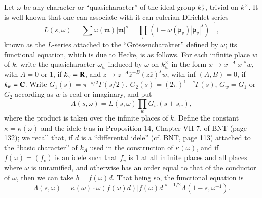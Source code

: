 Let $\omega$ be any character or ``quasicharacter'' of the ideal group $k^{\times}_{A}$, trivial on $k^{\times}$. It is well known that one can associate with it can eulerian Dirichlet series
\begin{equation*}
L(s,\omega)=\sum \omega(\mathfrak{m})|\mathfrak{m}|^{s}=\prod\limits_{v}(1-\omega(\mathfrak{p}_{v})|\mathfrak{p}_{v}|^{s})^{-1},\tag{2}\label{art21-eq2}
\end{equation*}
known as the $L$-series attached to the ``Gr\"ossencharakter'' defined by $\omega$; its functional equation, which is due to Hecke, is as follows. For each infinite place $w$ of $k$, write the quasicharacter $\omega_{w}$ induced by $\omega$ on $k^{\times}_{w}$ in the form $x\to x^{-A}|x|^{s}w$, with $A=0$ or $1$, if $k_{w}=\mathbf{R}$, and $z\to z^{-A}\overline{z}^{-B}(z\overline{z})^{s}w$, with inf $(A,B)=0$, if $k_{w}=\mathbf{C}$. Write $G_{1}(s)=\pi^{-s/2}\Gamma(s/2)$, $G_{2}(s)=(2\pi)^{1-s}\Gamma(s)$, $G_{w}=G_{1}$ or $G_{2}$ according as $w$ is real or imaginary, and put
$$
\Lambda (s,\omega)=L(s,\omega)\prod\limits_{w}G_{w}(s+s_{w}),
$$
where the product is taken over the infinite places of $k$. Define the constant $\kappa=\kappa(\omega)$ and the idele $b$ as in Proposition 14, Chapter VII-7, of BNT (page 132); we recall that, if $d$ is a ``differental idele'' (cf. BNT, page 113) attached to the ``basic character'' of $k_{A}$ used in the construction of $\kappa(\omega)$, and if $f(\omega)=(f_{v})$ is an idele such that $f_{v}$ is $1$ at all infinite places and all places where $\omega$ is unramified, and otherwise has an order equal to that of the conductor of $\omega$, then we can take $b=f(\omega)d$. That being so, the functional equation is
\begin{equation*}
\Lambda (s,\omega)=\kappa(\omega)\cdot \omega(f(\omega)d)|f(\omega)d|^{s-1/2}\Lambda(1-s,\omega^{-1}).\tag{3}\label{art21-eq3}
\end{equation*}

